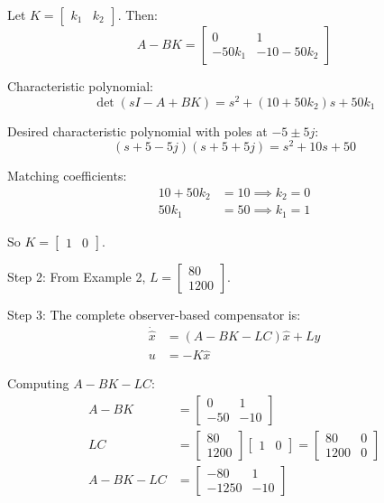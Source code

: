 Let $K = \begin{bmatrix} k_1 & k_2 \end{bmatrix}$. Then:
\begin{equation}
A - BK = \begin{bmatrix} 0 & 1 \\ -50k_1 & -10 - 50k_2 \end{bmatrix}
\end{equation}

Characteristic polynomial:
\begin{equation}
\det(sI - A + BK) = s^2 + (10 + 50k_2)s + 50k_1
\end{equation}

Desired characteristic polynomial with poles at $-5 \pm 5j$:
\begin{equation}
(s + 5 - 5j)(s + 5 + 5j) = s^2 + 10s + 50
\end{equation}

Matching coefficients:
\begin{align}
10 + 50k_2 &= 10 \implies k_2 = 0 \\
50k_1 &= 50 \implies k_1 = 1
\end{align}

So $K = \begin{bmatrix} 1 & 0 \end{bmatrix}$.

Step 2: From Example 2, $L = \begin{bmatrix} 80 \\ 1200 \end{bmatrix}$.

Step 3: The complete observer-based compensator is:
\begin{align}
\dot{\hat{x}} &= (A - BK - LC)\hat{x} + Ly \\
u &= -K\hat{x}
\end{align}

Computing $A - BK - LC$:
\begin{align}
A - BK &= \begin{bmatrix} 0 & 1 \\ -50 & -10 \end{bmatrix} \\
LC &= \begin{bmatrix} 80 \\ 1200 \end{bmatrix} \begin{bmatrix} 1 & 0 \end{bmatrix} = \begin{bmatrix} 80 & 0 \\ 1200 & 0 \end{bmatrix} \\
A - BK - LC &= \begin{bmatrix} -80 & 1 \\ -1250 & -10 \end{bmatrix}
\end{align}

